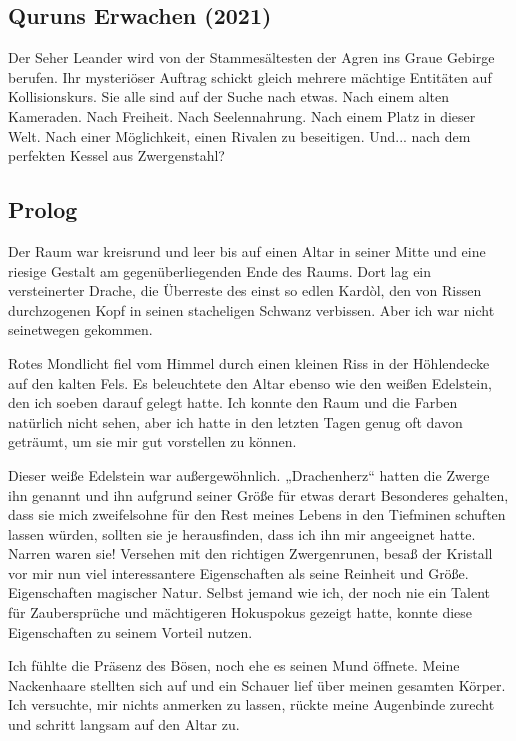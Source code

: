 \begin{chapterbox}
    \chapter{Quruns Erwachen (2021)}
    \label{Quruns Erwachen (2021)}
    
    Der Seher Leander wird von der Stammesältesten der Agren ins Graue Gebirge berufen. Ihr mysteriöser Auftrag schickt gleich mehrere mächtige Entitäten auf Kollisionskurs. Sie alle sind auf der Suche nach etwas. Nach einem alten Kameraden. Nach Freiheit. Nach Seelennahrung. Nach einem Platz in dieser Welt. Nach einer Möglichkeit, einen Rivalen zu beseitigen. Und... nach dem perfekten Kessel aus Zwergenstahl?
\end{chapterbox}


\section{Prolog}


Der Raum war kreisrund und leer bis auf einen Altar in seiner Mitte und eine riesige Gestalt am gegenüberliegenden Ende des Raums. Dort lag ein versteinerter Drache, die Überreste des einst so edlen Kardòl, den von Rissen durchzogenen Kopf in seinen stacheligen Schwanz verbissen. Aber ich war nicht seinetwegen gekommen.

Rotes Mondlicht fiel vom Himmel durch einen kleinen Riss in der Höhlendecke auf den kalten Fels. Es beleuchtete den Altar ebenso wie den weißen Edelstein, den ich soeben darauf gelegt hatte. Ich konnte den Raum und die Farben natürlich nicht sehen, aber ich hatte in den letzten Tagen genug oft davon geträumt, um sie mir gut vorstellen zu können.

Dieser weiße Edelstein war außergewöhnlich. „Drachenherz“ hatten die Zwerge ihn genannt und ihn aufgrund seiner Größe für etwas derart Besonderes gehalten, dass sie mich zweifelsohne für den Rest meines Lebens in den Tiefminen schuften lassen würden, sollten sie je herausfinden, dass ich ihn mir angeeignet hatte. Narren waren sie! Versehen mit den richtigen Zwergenrunen, besaß der Kristall vor mir nun viel interessantere Eigenschaften als seine Reinheit und Größe. Eigenschaften magischer Natur. Selbst jemand wie ich, der noch nie ein Talent für Zaubersprüche und mächtigeren Hokuspokus gezeigt hatte, konnte diese Eigenschaften zu seinem Vorteil nutzen.

Ich fühlte die Präsenz des Bösen, noch ehe es seinen Mund öffnete. Meine Nackenhaare stellten sich auf und ein Schauer lief über meinen gesamten Körper. Ich versuchte, mir nichts anmerken zu lassen, rückte meine Augenbinde zurecht und schritt langsam auf den Altar zu.

